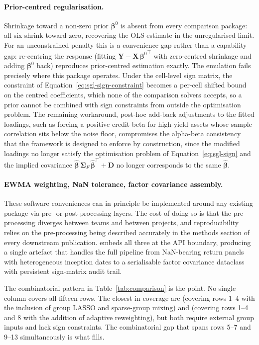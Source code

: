 \documentclass[article]{jss}
\begin{document}
\paragraph{Prior-centred regularisation.}
Shrinkage toward a non-zero prior $\bm{\beta}^0$ is absent from every
comparison package: all six shrink toward zero, recovering the OLS
estimate in the unregularised limit. For an unconstrained penalty this
is a convenience gap rather than a capability gap: re-centring the
response (fitting $\bm{Y} - \bm{X}\,{\bm{\beta}^{0}}^{\top}$ with
zero-centred shrinkage and adding $\bm{\beta}^0$ back) reproduces
prior-centred estimation exactly. The emulation fails precisely where
this package operates. Under the cell-level sign matrix, the constraint
of Equation~\ref{eq:sgl-sign-constraint} becomes a per-cell shifted
bound on the centred coefficients, which none of the comparison solvers
accepts, so a prior cannot be combined with sign constraints from
outside the optimisation problem. The remaining workaround, post-hoc
add-back adjustments to the fitted loadings, such as forcing a positive
credit beta for high-yield assets whose sample correlation sits below
the noise floor, compromises the alpha-beta consistency that the
framework is designed to enforce by construction, since the modified
loadings no longer satisfy the optimisation problem of
Equation~\ref{eq:sgl-sign} and the implied covariance
$\hat{\bm{\beta}}\, \bm{\Sigma}_F\, \hat{\bm{\beta}}^\top + \bm{D}$
no longer corresponds to the same $\hat{\bm{\beta}}$.

\paragraph{EWMA weighting, NaN tolerance, factor covariance assembly.}
These software conveniences can in principle be implemented around any
existing package via pre- or post-processing layers. The cost of doing
so is that the pre-processing diverges between teams and between
projects, and reproducibility relies on the pre-processing being
described accurately in the methods section of every downstream
publication.  embeds all three at the API boundary,
producing a single artefact that handles the full pipeline from
NaN-bearing return panels with heterogeneous inception dates to a
serialisable factor covariance dataclass with persistent sign-matrix
audit trail.

\bigskip

The combinatorial pattern in Table~\ref{tab:comparison} is the point.
No single column covers all fifteen rows. The closest in coverage are
 (covering rows 1--4 with the inclusion of group LASSO
and sparse-group mixing) and  (covering rows 1--4 and 8
with the addition of adaptive reweighting), but both require external
group inputs and lack sign constraints. The combinatorial gap that
spans rows 5--7 and 9--13 simultaneously is what 
fills.
\end{document}
